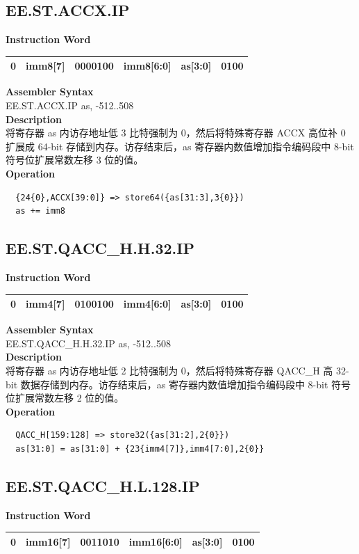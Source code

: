 \clearpage
\subsection{EE.ST.ACCX.IP}\label{instruction:EESTACCXIP}
\setlength\tabcolsep{6pt}
\textbf{Instruction Word} \\
\begin{tabular}{|c|c|c|c|c|c|}
	\hline
	0 & imm8[7] & 0000100 & imm8[6:0] & as[3:0] & 0100 \\
	\hline
\end{tabular}

\textbf{Assembler Syntax} \\
EE.ST.ACCX.IP as, -512..508 \\
\textbf{Description} \\
将寄存器 as 内访存地址低 3 比特强制为 0，然后将特殊寄存器 ACCX 高位补 0 扩展成 64-bit 存储到内存。访存结束后，as 寄存器内数值增加指令编码段中 8-bit 符号位扩展常数左移 3 位的值。\\
\textbf{Operation}
\begin{lstlisting}
  {24{0},ACCX[39:0]} => store64({as[31:3],3{0}})
  as += imm8
\end{lstlisting}

\clearpage
\subsection{EE.ST.QACC\_H.H.32.IP}\label{instruction:EESTQACCHH32IP}
\setlength\tabcolsep{6pt}
\textbf{Instruction Word} \\
\begin{tabular}{|c|c|c|c|c|c|}
	\hline
	0 & imm4[7] & 0100100 & imm4[6:0] & as[3:0] & 0100 \\
	\hline
\end{tabular}

\textbf{Assembler Syntax} \\
EE.ST.QACC\_H.H.32.IP as, -512..508 \\
\textbf{Description} \\
将寄存器 as 内访存地址低 2 比特强制为 0，然后将特殊寄存器 QACC\_H 高 32-bit 数据存储到内存。访存结束后，as 寄存器内数值增加指令编码段中 8-bit 符号位扩展常数左移 2 位的值。\\
\textbf{Operation}
\begin{lstlisting}
  QACC_H[159:128] => store32({as[31:2],2{0}})
  as[31:0] = as[31:0] + {23{imm4[7]},imm4[7:0],2{0}}
\end{lstlisting}

\clearpage
\subsection{EE.ST.QACC\_H.L.128.IP}\label{instruction:EESTQACCHL128IP}
\setlength\tabcolsep{6pt}
\textbf{Instruction Word} \\
\begin{tabular}{|c|c|c|c|c|c|}
	\hline
	0 & imm16[7] & 0011010 & imm16[6:0] & as[3:0] & 0100 \\
	\hline
\end{tabular}

